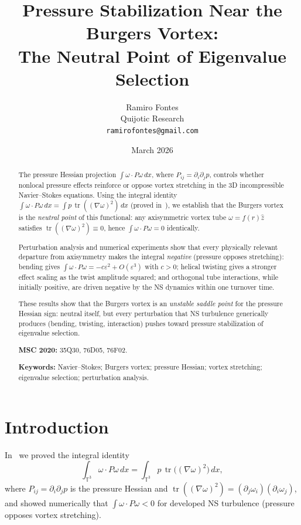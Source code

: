 \documentclass[11pt,a4paper]{article}
\title{Pressure Stabilization Near the Burgers Vortex:\\
The Neutral Point of Eigenvalue Selection}
\author{Ramiro Fontes\\Quijotic Research\\
\texttt{ramirofontes@gmail.com}}
\date{March 2026}
\theoremstyle{plain}
\theoremstyle{definition}
\theoremstyle{remark}
\newcommand{\T}{\mathbb{T}}
\DeclareMathOperator{\tr}{tr}
\begin{document}
\maketitle

\begin{abstract}
The pressure Hessian projection
$\int\omega\cdot P\omega\,dx$, where
$P_{ij}=\partial_i\partial_j p$, controls whether
nonlocal pressure effects reinforce or oppose
vortex stretching in the 3D incompressible
Navier--Stokes equations.  Using the integral
identity
$\int\omega\cdot P\omega\,dx
= \int p\,\tr((\nabla\omega)^2)\,dx$
(proved in~\cite{Fontes2026eigen}), we establish
that the Burgers vortex is the \emph{neutral point}
of this functional: any axisymmetric vortex tube
$\omega = f(r)\hat z$ satisfies
$\tr((\nabla\omega)^2)\equiv 0$, hence
$\int\omega\cdot P\omega=0$ identically.

Perturbation analysis and numerical experiments
show that every physically relevant departure from
axisymmetry makes the integral \emph{negative}
(pressure opposes stretching): bending gives
$\int\omega\cdot P\omega = -c\varepsilon^2+O(\varepsilon^3)$
with $c>0$; helical twisting gives a stronger
effect scaling as the twist amplitude squared;
and orthogonal tube interactions, while initially
positive, are driven negative by the NS dynamics
within one turnover time.

These results show that the Burgers vortex is an
\emph{unstable saddle point} for the pressure
Hessian sign: neutral itself, but every perturbation
that NS turbulence generically produces (bending,
twisting, interaction) pushes toward pressure
stabilization of eigenvalue selection.

\smallskip\noindent\textbf{MSC 2020:}
35Q30, 76D05, 76F02.

\smallskip\noindent\textbf{Keywords:}
Navier--Stokes; Burgers vortex; pressure Hessian;
vortex stretching; eigenvalue selection;
perturbation analysis.
\end{abstract}

\tableofcontents
\newpage

\section{Introduction}\label{sec:intro}

In~\cite{Fontes2026eigen} we proved the integral
identity
\begin{equation}\label{eq:identity}
\int_{\T^3}\omega\cdot P\omega\,dx
= \int_{\T^3}p\,\tr\bigl((\nabla\omega)^2\bigr)\,dx,
\end{equation}
where $P_{ij}=\partial_i\partial_j p$ is the
pressure Hessian and
$\tr((\nabla\omega)^2)=(\partial_j\omega_i)
(\partial_i\omega_j)$, and showed numerically that
$\int\omega\cdot P\omega<0$ for developed NS
turbulence (pressure opposes vortex stretching).
\end{document}
